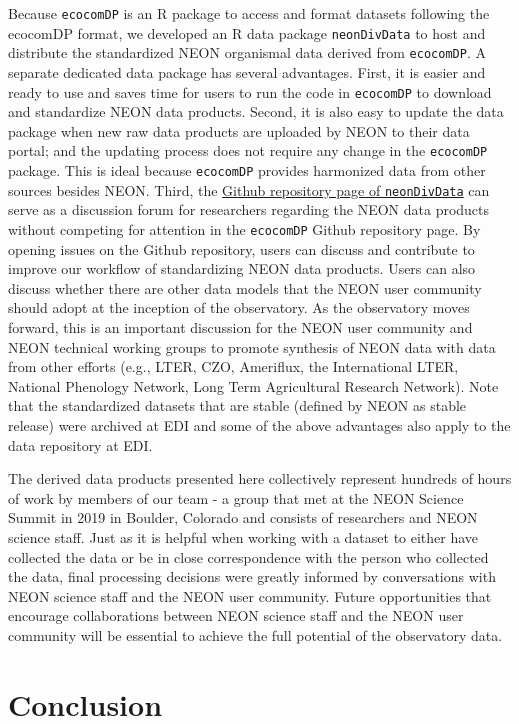 \documentclass[
  12pt,
]{article}
\begin{document}
Because \texttt{ecocomDP} is an R package to access and format datasets following the ecocomDP format, we developed an R data package \texttt{neonDivData} to host and distribute the standardized NEON organismal data derived from \texttt{ecocomDP}. A separate dedicated data package has several advantages. First, it is easier and ready to use and saves time for users to run the code in \texttt{ecocomDP} to download and standardize NEON data products. Second, it is also easy to update the data package when new raw data products are uploaded by NEON to their data portal; and the updating process does not require any change in the \texttt{ecocomDP} package. This is ideal because \texttt{ecocomDP} provides harmonized data from other sources besides NEON. Third, the \href{(https://github.com/daijiang/neonDivData)}{Github repository page of \texttt{neonDivData}} can serve as a discussion forum for researchers regarding the NEON data products without competing for attention in the \texttt{ecocomDP} Github repository page. By opening issues on the Github repository, users can discuss and contribute to improve our workflow of standardizing NEON data products. Users can also discuss whether there are other data models that the NEON user community should adopt at the inception of the observatory. As the observatory moves forward, this is an important discussion for the NEON user community and NEON technical working groups to promote synthesis of NEON data with data from other efforts (e.g., LTER, CZO, Ameriflux, the International LTER, National Phenology Network, Long Term Agricultural Research Network). Note that the standardized datasets that are stable (defined by NEON as stable release) were archived at EDI and some of the above advantages also apply to the data repository at EDI.

The derived data products presented here collectively represent hundreds of hours of work by members of our team - a group that met at the NEON Science Summit in 2019 in Boulder, Colorado and consists of researchers and NEON science staff. Just as it is helpful when working with a dataset to either have collected the data or be in close correspondence with the person who collected the data, final processing decisions were greatly informed by conversations with NEON science staff and the NEON user community. Future opportunities that encourage collaborations between NEON science staff and the NEON user community will be essential to achieve the full potential of the observatory data.

\hypertarget{conclusion}{%
\section{Conclusion}\label{conclusion}}
\end{document}
